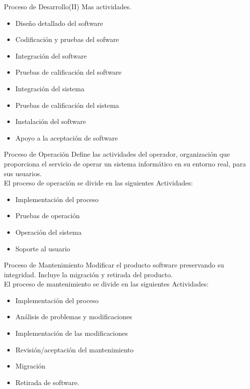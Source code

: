 \documentclass{beamer}
\begin{document}
			
			\begin{frame}{Proceso de Desarrollo(II)}
				Mas actividades.
					\begin{itemize}
		 				\item Diseño detallado del software
						\item Codificación y pruebas del sofware
						\item Integración del software
						\item Pruebas de calificación del software
						\item Integración del sistema
						\item Pruebas de calificación del sistema
						\item Instalación del software
						\item Apoyo a la aceptación de software
					\end{itemize}
			\end{frame}
			
			\begin{frame}{Proceso de Operación}
				Define las actividades del operador, organización que proporciona el servicio de operar un sistema informático en su entorno real, para sus usuarios.\\

					El proceso de operación se divide en las siguientes Actividades:
					\begin{itemize}
						\item Implementación del proceso
						\item Pruebas de operación
						\item Operación del sistema
						\item Soporte al usuario 
					\end{itemize}
			\end{frame}
			
			\begin{frame}{Proceso de Mantenimiento}
				Modificar el producto software preservando su integridad. Incluye la migración y retirada del producto.\\
				
				El proceso de mantenimiento se divide en las siguientes Actividades:
				\begin{itemize}
					\item Implementación del proceso
					\item Análisis de problemas y modificaciones
					\item Implementación de las modificaciones
					\item Revisión/aceptación del mantenimiento
					\item Migración
					\item Retirada de software.
				\end{itemize}
			\end{frame}
			
\end{document}
